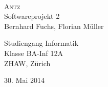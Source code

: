 




\begin{titlepage}
   \mbox{}\vspace{3\baselineskip}\\
   \rmfamily\huge
   \centering
   \textsc{Antz} \\[2ex]
   Softwareprojekt 2
   \rmfamily\Large
   \vspace{1\baselineskip}\\
   \vspace{5\baselineskip}
   \rmfamily\Large
   Bernhard Fuchs, Florian Müller \\
   \vspace{10\baselineskip}   
   \begin{large}
   Studiengang Informatik \\
   Klasse BA-Inf 12A \\
   ZHAW, Zürich \\
   \end{large}
   \vspace{5\baselineskip}   
   30. Mai 2014
\end{titlepage}
 



% 

